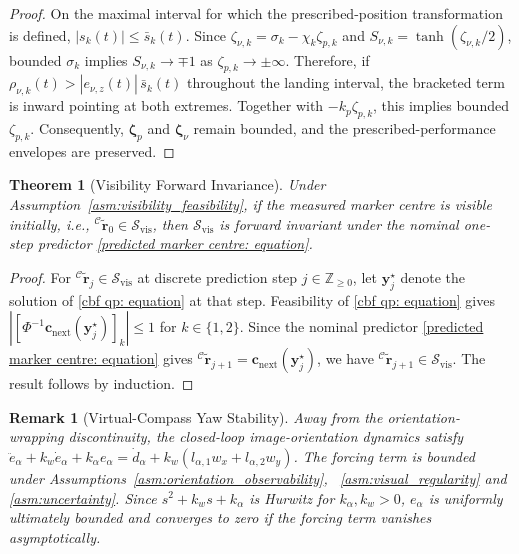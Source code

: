 \documentclass[10pt,conference]{IEEEtran}
\newtheorem{theorem}{Theorem}
\newtheorem{remark}{Remark}
\begin{document}
\begin{proof}
On the maximal interval for which the prescribed-position transformation is defined, $|s_k(t)|\leq\bar s_k(t)$. Since $\zeta_{\nu,k}=\sigma_k-\chi_k\zeta_{p,k}$ and $S_{\nu,k}=\tanh(\zeta_{\nu,k}/2)$, bounded $\sigma_k$ implies $S_{\nu,k}\to\mp1$ as $\zeta_{p,k}\to\pm\infty$. Therefore, if $\rho_{\nu,k}(t)>|e_{\nu,z}(t)|\,\bar s_k(t)$ throughout the landing interval, the bracketed term is inward pointing at both extremes. Together with $-k_p\zeta_{p,k}$, this implies bounded $\zeta_{p,k}$. Consequently, $\boldsymbol\zeta_p$ and $\boldsymbol\zeta_\nu$ remain bounded, and the prescribed-performance envelopes are preserved.
\end{proof}

\begin{theorem}[Visibility Forward Invariance]
\label{thm:visibility}
Under Assumption~\ref{asm:visibility_feasibility}, if the measured marker centre is visible initially, i.e., ${}^{\mathcal C}\tilde{\boldsymbol r}_0 \in\mathcal S_{\mathrm{vis}}$, then $\mathcal S_{\mathrm{vis}}$ is forward invariant under the nominal one-step predictor \eqref{predicted marker centre: equation}.
\end{theorem}

\begin{proof}
For ${}^{\mathcal C}\tilde{\boldsymbol r}_j\in\mathcal S_{\mathrm{vis}}$ at discrete prediction step  $j\in\mathbb Z_{\geq0}$, let $\boldsymbol y_j^\star$ denote the solution of \eqref{cbf qp: equation} at that step. Feasibility of \eqref{cbf qp: equation} gives $\left|\left[\Phi^{-1} \boldsymbol c_{\mathrm{next}}(\boldsymbol y_j^\star)\right]_k\right| \le1$ for $k\in\{1,2\}$. Since the nominal predictor \eqref{predicted marker centre: equation} gives ${}^{\mathcal C}\tilde{\boldsymbol r}_{j+1} = \boldsymbol c_{\mathrm{next}}(\boldsymbol y_j^\star)$, we have ${}^{\mathcal C}\tilde{\boldsymbol r}_{j+1}\in\mathcal S_{\mathrm{vis}}$. The result follows by induction.
\end{proof}

\begin{remark}[Virtual-Compass Yaw Stability]
\label{rem:yaw_stability}
Away from the orientation-wrapping discontinuity, the closed-loop image-orientation dynamics satisfy $\ddot e_\alpha+k_w\dot e_\alpha+k_\alpha e_\alpha = \dot d_\alpha + k_w\left(l_{\alpha,1}w_x + l_{\alpha,2}w_y\right)$.
The forcing term is bounded under Assumptions~\ref{asm:orientation_observability}, ~\ref{asm:visual_regularity} and \ref{asm:uncertainty}. Since $s^2+k_ws+k_\alpha$ is Hurwitz for $k_\alpha,k_w>0$, $e_\alpha$ is uniformly ultimately bounded and converges to zero if the forcing term vanishes asymptotically.
\end{remark}
\end{document}
